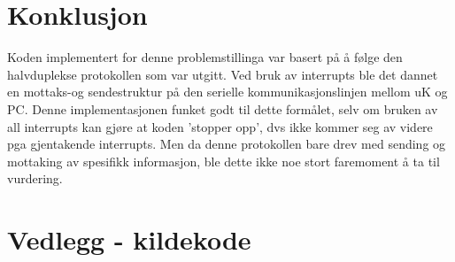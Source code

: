\documentclass[12pt, a4paper]{report}
\begin{document}
\section{Konklusjon}

Koden implementert for denne problemstillinga var basert på å følge den halvduplekse protokollen som var utgitt. Ved bruk av interrupts ble det dannet en mottaks-og sendestruktur på den serielle kommunikasjonslinjen mellom uK og PC. Denne implementasjonen funket godt til dette formålet, selv om bruken av all interrupts kan gjøre at koden 'stopper opp', dvs ikke kommer seg av videre pga gjentakende interrupts. Men da denne protokollen bare drev med sending og mottaking av spesifikk informasjon, ble dette ikke noe stort faremoment å ta til vurdering.

\newpage

\section{Vedlegg - kildekode}

\end{document}
